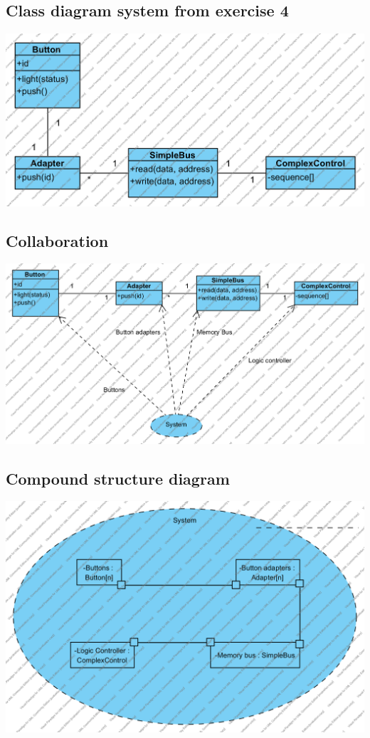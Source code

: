 \documentclass{article}
\begin{document}
\subsection{Class diagram system from exercise 4}
  \includegraphics[width=\linewidth]{../class3}
\subsection{Collaboration}
  \includegraphics[width=\linewidth]{../class4}
\subsection{Compound structure diagram}
  \includegraphics[width=\linewidth]{../comp2}
\end{document}
